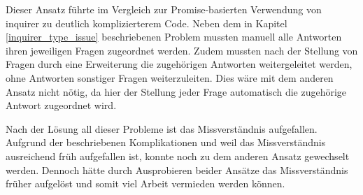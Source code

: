 Dieser Ansatz führte im Vergleich zur Promise-basierten Verwendung von inquirer zu deutlich komplizierterem Code. Neben dem in Kapitel \ref{inquirer_type_issue} beschriebenen Problem mussten manuell alle Antworten ihren jeweiligen Fragen zugeordnet werden. Zudem mussten nach der Stellung von Fragen durch eine Erweiterung die zugehörigen Antworten weitergeleitet werden, ohne Antworten sonstiger Fragen weiterzuleiten. Dies wäre mit dem anderen Ansatz nicht nötig, da hier der Stellung jeder Frage automatisch die zugehörige Antwort zugeordnet wird.

Nach der Lösung all dieser Probleme ist das Missverständnis aufgefallen. Aufgrund der beschriebenen Komplikationen und weil das Missverständnis ausreichend früh aufgefallen ist, konnte noch zu dem anderen Ansatz gewechselt werden. Dennoch hätte durch Ausprobieren beider Ansätze das Missverständnis früher aufgelöst und somit viel Arbeit vermieden werden können.
